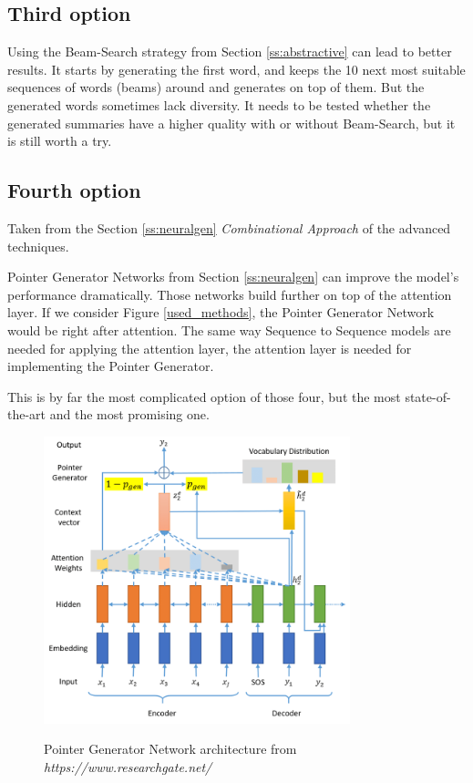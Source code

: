 \subsection{Third option}
Using the Beam-Search strategy from Section \ref{ss:abstractive} can lead to better results. It starts by generating the first word, and keeps the 10 next most suitable sequences of words (beams) around and generates on top of them. But the generated words sometimes lack diversity. It needs to be tested whether the generated summaries have a higher quality with or without Beam-Search, but it is still worth a try. 


\subsection{Fourth option}

Taken from the Section \ref{ss:neuralgen} \textit{Combinational Approach} of the advanced techniques.

Pointer Generator Networks from Section \ref{ss:neuralgen} can improve the model's performance dramatically. Those networks build further on top of the attention layer. If we consider Figure \ref{used_methods}, the Pointer Generator Network would be right after attention. The same way Sequence to Sequence models are needed for applying the attention layer, the attention layer is needed for implementing the Pointer Generator. 

This is by far the most complicated option of those four, but the most state-of-the-art and the most promising one. 

\begin{figure}
	\begin{center}
		\includegraphics[width=3.5in]{photos/pgn}\\
		\caption{Pointer Generator Network architecture from \textit{https://www.researchgate.net/}}\label{pgn}
	\end{center}
\end{figure}

